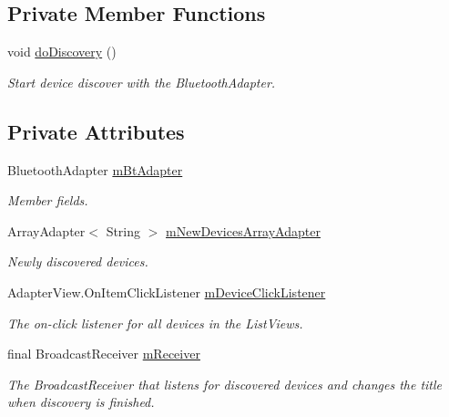 \subsection*{Private Member Functions}
\begin{DoxyCompactItemize}
\item 
void \mbox{\hyperlink{classhi_1_1world_1_1hello_1_1myapplication_1_1_device_list_activity_a5e5f542b8b5614616f5b759c6b46a3f0}{do\+Discovery}} ()
\begin{DoxyCompactList}\small\item\em Start device discover with the Bluetooth\+Adapter. \end{DoxyCompactList}\end{DoxyCompactItemize}
\subsection*{Private Attributes}
\begin{DoxyCompactItemize}
\item 
Bluetooth\+Adapter \mbox{\hyperlink{classhi_1_1world_1_1hello_1_1myapplication_1_1_device_list_activity_a85e13ad225a08d62f1ca14e00f12ff3f}{m\+Bt\+Adapter}}
\begin{DoxyCompactList}\small\item\em Member fields. \end{DoxyCompactList}\item 
Array\+Adapter$<$ String $>$ \mbox{\hyperlink{classhi_1_1world_1_1hello_1_1myapplication_1_1_device_list_activity_a64ba77faaac6b9e85e20822a85aa1392}{m\+New\+Devices\+Array\+Adapter}}
\begin{DoxyCompactList}\small\item\em Newly discovered devices. \end{DoxyCompactList}\item 
Adapter\+View.\+On\+Item\+Click\+Listener \mbox{\hyperlink{classhi_1_1world_1_1hello_1_1myapplication_1_1_device_list_activity_a6f2f4cd4c09ef11b49f95aafce654d9f}{m\+Device\+Click\+Listener}}
\begin{DoxyCompactList}\small\item\em The on-\/click listener for all devices in the List\+Views. \end{DoxyCompactList}\item 
final Broadcast\+Receiver \mbox{\hyperlink{classhi_1_1world_1_1hello_1_1myapplication_1_1_device_list_activity_aa946e1b25658fa8217545409eccb9cbf}{m\+Receiver}}
\begin{DoxyCompactList}\small\item\em The Broadcast\+Receiver that listens for discovered devices and changes the title when discovery is finished. \end{DoxyCompactList}\end{DoxyCompactItemize}
